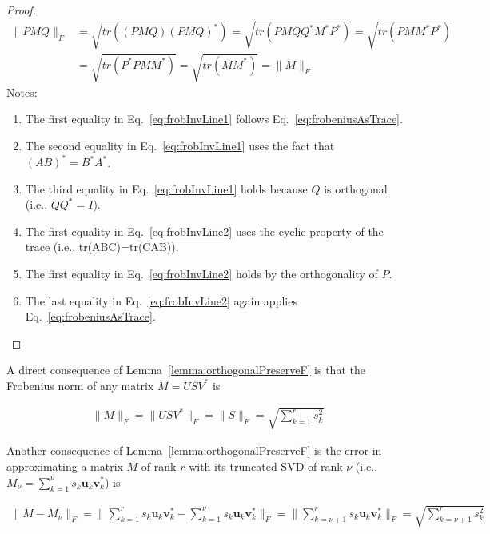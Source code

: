 \documentclass[12pt]{article}
\begin{document}
\begin{appendices}
    \begin{proof}
        \begin{align}
            \|PMQ\|_F&=\sqrt{tr((PMQ)(PMQ)^*)}=\sqrt{tr(PMQQ^*M^*P^*)}=\sqrt{tr(PMM^*P^*)\label{eq:frobInvLine1}}\\
                     &=\sqrt{tr(P^*PMM^*)}=\sqrt{tr(MM^*)}=\|M\|_F\label{eq:frobInvLine2}
        \end{align}
        Notes:
        \begin{enumerate}
            \item The first equality in Eq.~\ref{eq:frobInvLine1} follows
                Eq.~\ref{eq:frobeniusAsTrace}.
            \item The second equality in Eq.~\ref{eq:frobInvLine1} uses the fact
                that $(AB)^*=B^*A^*$.
            \item The third equality in Eq.~\ref{eq:frobInvLine1} holds because
                $Q$ is orthogonal (i.e., $QQ^*=I$).
            \item The first equality in Eq.~\ref{eq:frobInvLine2} uses the
                cyclic property of the trace (i.e., tr(ABC)=tr(CAB)).
            \item The first equality in Eq.~\ref{eq:frobInvLine2} holds by the
                orthogonality of $P$.
            \item The last equality in Eq.~\ref{eq:frobInvLine2} again applies
                Eq.~\ref{eq:frobeniusAsTrace}.
        \end{enumerate}
    \end{proof}

    A direct consequence of Lemma~\ref{lemma:orthogonalPreserveF} is that the
    Frobenius norm of any matrix $M=USV^*$ is

    \begin{align*}
        \|M\|_F=\|USV^*\|_F=\|S\|_F=\sqrt{\sum_{k=1}^rs_k^2}
    \end{align*}

    Another consequence of Lemma~\ref{lemma:orthogonalPreserveF} is 
    the error in approximating a matrix $M$ of rank $r$ with its truncated
    SVD of rank $\nu$ (i.e., $M_\nu=\sum_{k=1}^\nu s_k\mathbf{u}_k\mathbf{v}_k^*$) is

    \begin{align}
        \|M-M_\nu\|_F=\|\sum_{k=1}^rs_k\mathbf{u}_k\mathbf{v}_k^*-\sum_{k=1}^\nu
        s_k\mathbf{u}_k\mathbf{v}_k^*\|_F=\|\sum_{k={\nu+1}}^rs_k\mathbf{u}_k\mathbf{v}_k^*\|_F=\sqrt{\sum_{k=\nu+1}^rs_k^2}\label{eq:truncSVDerror}
    \end{align}


\end{appendices}
\end{document}
